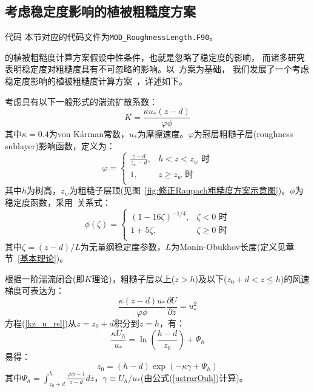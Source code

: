\subsection{考虑稳定度影响的植被粗糙度方案}\label{考虑稳定度粗糙度方案}
\begin{mymdframed}{代码}
本节对应的代码文件为\texttt{MOD\_RoughnessLength.F90}。
\end{mymdframed}

\citet{raupach1992drag,raupach1994simplified}的植被粗糙度计算方案假设中性条件，也就是忽略了稳定度的影响，
而诸多研究表明稳定度对粗糙度具有不可忽略的影响。以~\citet{raupach1992drag,raupach1994simplified}方案为基础，
我们发展了一个考虑稳定度影响的植被粗糙度计算方案~\citep{liu2023roughnesslength}，详述如下。

考虑具有以下一般形式的湍流扩散系数：
\begin{equation}\label{eddydiffusivity}
K=\frac{\kappa u_{*} (z-d)} {\varphi \phi }
\end{equation}
其中$\kappa=0.4$为von K\'arman常数，$u_{*}$为摩擦速度。$\varphi$为冠层粗糙子层(roughness sublayer)影响函数，定义为：
\begin{equation}
\varphi = \begin{cases}
   \frac{z-d} {z_{w}-d}, & h<z<z_{w} \text { 时} \\
   1, & z \geqslant z_{w} \text { 时} \\
\end{cases}
\end{equation}
其中$h$为树高，$z_{w}$为粗糙子层顶(见图~\ref{fig:修正Raupach粗糙度方案示意图})。$\phi$为稳定度函数，采用~\citet{dyer1974review}关系式：
\begin{equation}
\phi(\zeta) = \begin{cases}
   (1-16\zeta)^{-1/4}, & \zeta<0 \text { 时} \\
   1+5\zeta, & \zeta \geqslant 0 \text { 时} \\
\end{cases}
\end{equation}
其中$\zeta = (z-d)/L$为无量纲稳定度参数，$L$为Monin-Obukhov长度(定义见章节~\ref{基本理论})。

根据一阶湍流闭合(即$K$理论)，粗糙子层以上($z>h$)及以下($z_0 + d<z \leqslant h$)的风速梯度可表达为：
\begin{equation}\label{kz_u_rsl}
\frac{\kappa (z-d) u_{*}}{\varphi \phi} \frac{\partial U}{\partial z}=u_{*}^2
\end{equation}
方程(\ref{kz_u_rsl})从$z=z_0+d$积分到$z=h$，有：
\begin{equation}\label{u_rsl_htop}
\frac{\kappa U_{h}}{u_{*}} = \ln \left(\frac{h-d}{z_{0}}\right) + \Psi_{h}
\end{equation}
易得：
\begin{equation}\label{z0_rsl}
z_{0} = (h-d)\exp (-\kappa \gamma + \Psi_{h})
\end{equation}
其中$\Psi_{h}=\int_{z_{0}+d}^{h} \frac{\varphi \phi - 1}{z-d} d z$，$\gamma \equiv U_{h}/u_{*}$(由公式(\ref{ustrarOuh})计算)。

